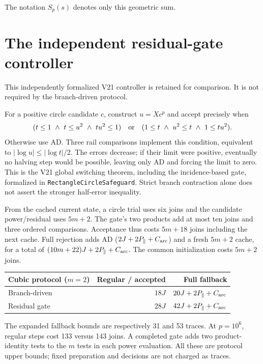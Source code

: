 \documentclass[11pt,a4paper]{article}
\begin{document}
The notation $S_p(s)$ denotes only this geometric sum.

\clearpage
\section{The independent residual-gate controller}\label{app:gate}
This independently formalized V21 controller is retained for comparison. It is not required by the branch-driven protocol.

For a positive circle candidate $c$, construct $u=Xc^p$ and accept precisely when
\begin{equation}\label{eq:gate}
 (t\le1\ \wedge\ t\le u^2\ \wedge\ tu^2\le1)
 \quad\hbox{or}\quad
 (1\le t\ \wedge\ u^2\le t\ \wedge\ 1\le tu^2).
\end{equation}
Otherwise use AD. Three rail comparisons implement this condition, equivalent to $|\log u|\le|\log t|/2$. The errors decrease; if their limit were positive, eventually no halving step would be possible, leaving only AD and forcing the limit to zero. This is the V21 global switching theorem, including the incidence-based gate, formalized in \texttt{RectangleCircleSafeguard}. Strict branch contraction alone does not assert the stronger half-error inequality.

From the cached current state, a circle trial uses six joins and the candidate power/residual uses $5m+2$. The gate's two products add at most ten joins and three ordered comparisons. Acceptance thus costs $5m+18$ joins including the next cache. Full rejection adds AD ($2J+2P_{\parallel}+C_{\rm arc}$) and a fresh $5m+2$ cache, for a total of $(10m+22)J+2P_{\parallel}+C_{\rm arc}$. The common initialization costs $5m+2$ joins.

\begin{center}\small
\begin{tabular}{@{}lrr@{}}\toprule
Cubic protocol ($m=2$) & Regular / accepted & Full fallback\\\midrule
Branch-driven & $18J$ & $20J+2P_{\parallel}+C_{\rm arc}$\\
Residual gate & $28J$ & $42J+2P_{\parallel}+C_{\rm arc}$\\\bottomrule
\end{tabular}
\end{center}
The expanded fallback bounds are respectively 31 and 53 traces. At $p=10^6$, regular steps cost 133 versus 143 joins. A completed gate adds two product-identity tests to the $m$ tests in each power evaluation. All these are protocol upper bounds; fixed preparation and decisions are not charged as traces.
\end{document}
